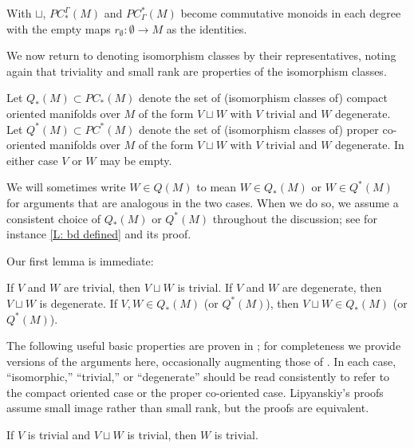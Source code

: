 With $\sqcup$, $PC^\Gamma_*(M)$ and $PC_\Gamma^*(M)$ become commutative monoids in each degree with the empty maps $r_\emptyset \colon \emptyset \to M$ as the identities.

We now return to denoting isomorphism classes by their representatives, noting again that triviality and small rank are properties of the isomorphism classes.

\begin{definition}
	Let $Q_*(M) \subset PC_*(M)$ denote the set of (isomorphism classes of) compact oriented manifolds over $M$ of the form $V \sqcup W$ with $V$ trivial and $W$ degenerate.
	Let $Q^*(M) \subset PC^*(M)$ denote the set of (isomorphism classes of) proper co-oriented manifolds over $M$ of the form $V \sqcup W$ with $V$ trivial and $W$ degenerate.
	In either case $V$ or $W$ may be empty.

	We will sometimes write $W \in Q(M)$ to mean $W \in Q_*(M)$ or $W \in Q^*(M)$ for arguments that are analogous in the two cases.
	When we do so, we assume a consistent choice of $Q_*(M)$ or $Q^*(M)$ throughout the discussion; see for instance \cref{L: bd defined} and its proof.
\end{definition}

Our first lemma is immediate:

\begin{lemma}\label{L: sum of trivial/degenerate}
If $V$ and $W$ are trivial, then $V \sqcup W$ is trivial.
If $V$ and $W$ are degenerate, then $V \sqcup W$ is degenerate.
If $V,W\in Q_*(M)$ (or $Q^*(M)$), then $V \sqcup W \in Q_*(M)$ (or $Q^*(M)$).
\end{lemma}

The following useful basic properties are proven in \cite{Lipy14}; for completeness we provide versions of the arguments here, occasionally augmenting those of \cite{Lipy14}.
In each case, ``isomorphic,'' ``trivial,'' or ``degenerate'' should be read consistently to refer to the compact oriented case or the proper co-oriented case.
Lipyanskiy's proofs assume small image rather than small rank, but the proofs are equivalent.



\begin{lemma}\label{L: Lip L10}
	If $V$ is trivial and $V \sqcup W$ is trivial, then $W$ is trivial.
\end{lemma}

